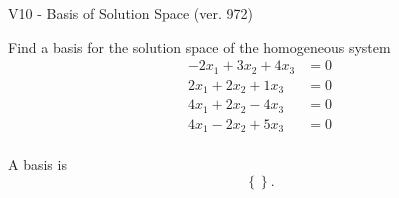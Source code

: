 \begin{exercise}
  \begin{exerciseTitle}V10 - Basis of Solution Space (ver. 972)\end{exerciseTitle}
  \begin{exerciseStatement}
    Find a basis for the solution space of the homogeneous system 
\begin{align*}
 -2 x_ 1 + 3 x_ 2 + 4 x_ 3 &= 0  \\ 
  2 x_ 1 + 2 x_ 2 + 1 x_ 3 &= 0  \\ 
  4 x_ 1 + 2 x_ 2 -4 x_ 3 &= 0  \\ 
  4 x_ 1 -2 x_ 2 + 5 x_ 3 &= 0  \\ 
 \end{align*}


 
  \end{exerciseStatement}

  \begin{exerciseAnswer}
   A basis is   
\[\left\{\right\}.\]

  


  \end{exerciseAnswer}
\end{exercise}